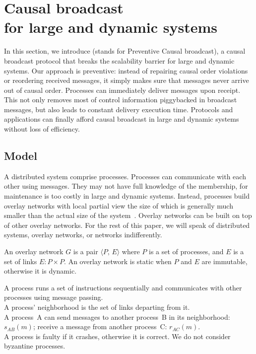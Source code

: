 
\section{Causal broadcast\\for large and dynamic systems}
\label{sec:proposal}

In this section, we introduce \CBROADCAST (stands for Preventive Causal
broadcast), a causal broadcast protocol that breaks the scalability barrier for
large and dynamic systems.  Our approach is preventive: instead of repairing
causal order violations or reordering received messages, it simply makes sure
that messages never arrive out of causal order. Processes can immediately
deliver messages upon receipt. This not only removes most of control information
piggybacked in broadcast messages, but also leads to constant delivery execution
time. Protocols and applications can finally afford causal broadcast in large
and dynamic systems without loss of efficiency.

\subsection{Model}

A distributed system comprise processes. Processes can communicate with each
other using messages. They may not have full knowledge of the membership, for
maintenance is too costly in large and dynamic systems. Instead, processes build
overlay networks with local partial view the size of which is generally much
smaller than the actual size of the
system~\cite{bertier-d2ht,jelasity2007gossip,jelasity2009tman}. Overlay networks
can be built on top of other overlay networks.  For the rest of this paper, we
will speak of distributed systems, overlay networks, or networks indifferently.

\begin{definition}
  An overlay network $G$ is a pair $\langle P,\, E\rangle$ where $P$ is a set of
  processes, and $E$ is a set of links $E: P\times P$. An overlay network is
  static when $P$ and $E$ are immutable, otherwise it
  is dynamic.
\end{definition}

\begin{definition}[Process]
  A process runs a set of instructions sequentially and communicates
  with other processes using message passing. \\
  A process' neighborhood is the set of links departing from it. \\
  A process~A can send messages to another process~B in its
  neighborhood: $s_{AB}(m)$; receive a message from another process~C:
  $r_{AC}(m)$. \\
  A process is faulty if it crashes, otherwise it is correct. We do not consider
  byzantine processes.
\end{definition}

